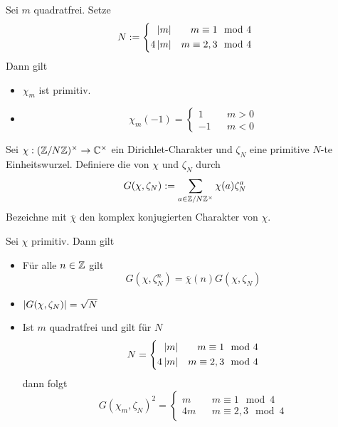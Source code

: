 \documentclass{book}
\begin{document}
\Lem{}
Sei $m$ quadratfrei. Setze
\begin{align*}
N := 
\left\lbrace\begin{aligned}
\left|m\right| && m \equiv 1 \mod{4}\\
4\left|m\right| && m \equiv 2,3 \mod{4}
\end{aligned}\right.
\end{align*}
Dann gilt
\begin{itemize}
\item $\chi_m$ ist primitiv.
\item 
\[ \chi_m(-1) = \left\lbrace
\begin{aligned}
1 && m > 0\\
-1 && m < 0
\end{aligned}
\right. \]
\end{itemize}

Sei $\chi : (\mathbb{Z}/N\mathbb{Z})^\times \overset{}{\rightarrow} \mathbb{C}^\times$ ein Dirichlet-Charakter und $\zeta_N$ eine primitive $N$-te Einheitswurzel. Definiere die  von $\chi$ und $\zeta_N$ durch
\[ G(\chi, \zeta_N) := \sum_{a \in \mathbb{Z}/N\mathbb{Z}^\times} \chi(a) \zeta_N^a \]
Bezeichne mit $\overline{\chi}$ den komplex konjugierten Charakter von $\chi$.

\Satz{}
Sei $\chi$ primitiv. Dann gilt
\begin{itemize}
\item Für alle $n \in \mathbb{Z}$ gilt
\[G(\chi, \zeta_N^n) = \overline{\chi}(n) G(\chi, \zeta_N) \]
\item $\left|G(\chi, \zeta_N)\right| = \sqrt{N}$
\item Ist $m$ quadratfrei und gilt für $N$
\begin{align*}
N = 
\left\lbrace\begin{aligned}
\left|m\right| && m \equiv 1 \mod{4}\\
4\left|m\right| && m \equiv 2,3 \mod{4}
\end{aligned}\right.
\end{align*}
dann folgt
\[ G(\chi_m, \zeta_N)^2 = \left\lbrace
\begin{aligned}
m && m \equiv 1 \mod{4}\\
4m && m \equiv 2,3 \mod{4}
\end{aligned}
\right. \]
\end{itemize}
\end{document}
